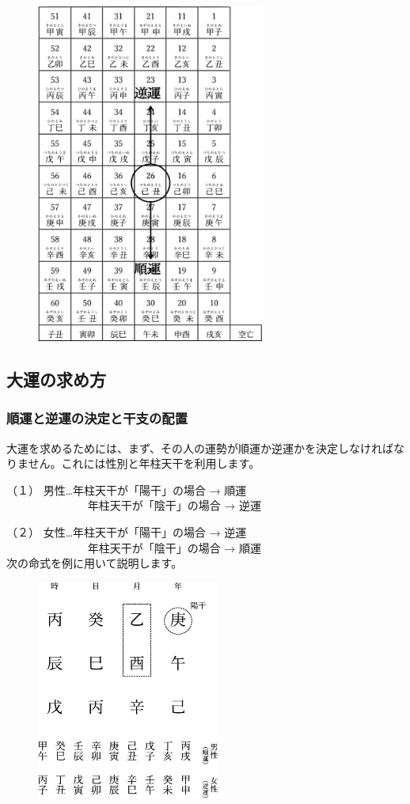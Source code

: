 \documentclass[a5paper,11pt,dvipdfmx]{tarticle}
\begin{document}
\begin{figure}[h]
  \centering
  \includegraphics[width=75mm,angle=90]{figs/figure4-1.eps}
\end{figure}

\subsection{大運の求め方}
\subsubsection*{順運と逆運の決定と干支の配置}
大運を求めるためには、まず、その人の運勢が順運か逆運かを決定しなければなりません。これには性別と年柱天干を利用します。

（１）	男性…年柱天干が「陽干」の場合 → 順運\\
　　　　　　　 年柱天干が「陰干」の場合 → 逆運

（２）	女性…年柱天干が「陽干」の場合 → 逆運\\
　　　　　　　 年柱天干が「陰干」の場合 → 順運\\

次の命式を例に用いて説明します。

\begin{figure}[h]
  \includegraphics[width=60mm,angle=90]{figs/figure4-2.eps}
\end{figure}
\end{document}
